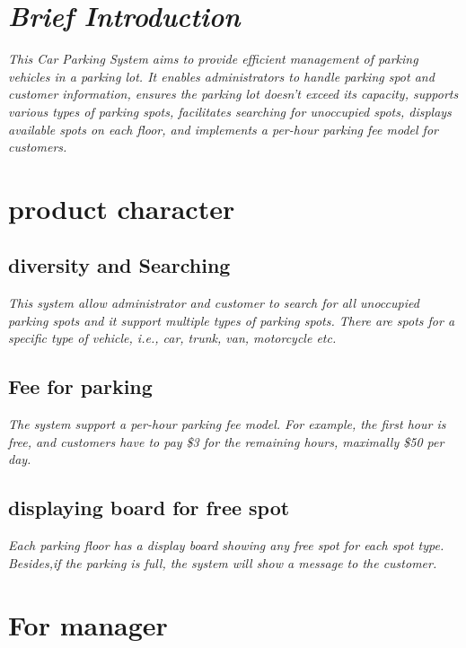 \pagestyle{fancy}
\fancyhead[L]{}
\renewcommand{\headrulewidth}{2pt}
\renewcommand{\baselinestretch}{1.5}
\setcounter{page}{2} 
{\rmfamily\selectfont
\vspace{-1ex}
	\section{\textsl{Brief Introduction}}
	{\slshape \selectfont
	\huge	This Car Parking System aims to provide efficient management of parking vehicles in a parking lot. It enables administrators to handle parking spot and customer information, ensures the parking lot doesn't exceed its capacity, supports various types of parking spots, facilitates searching for unoccupied spots, displays available spots on each floor, and implements a per-hour parking fee model for customers.\par
	}
	\newpage
	\section{product character}
	\subsection{diversity and Searching}
	{\slshape \selectfont
		\huge This system allow administrator and customer to search for all unoccupied parking spots and it support multiple types of parking spots. There are spots for a specific type of vehicle, i.e., car, trunk, van, motorcycle etc.
	}
	\subsection{Fee for parking}
	{\slshape \selectfont\huge
		The system support a per-hour parking fee model. For example, the first hour is free,
		and customers have to pay \$3 for the remaining hours, maximally \$50 per day.
	}
	\subsection{displaying board for free spot}
	{\slshape \selectfont\huge
		Each parking floor has a display board showing any free spot for each spot type. Besides,if the parking is full, the system will show a message to the customer.
	}
	\newpage
	\section{For manager}
}
